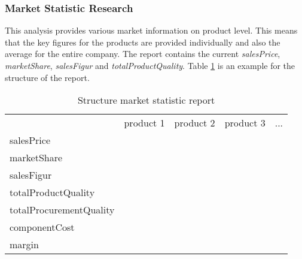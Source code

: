 \subsubsection{Market Statistic Research}
This analysis provides various market information on product level. This means that the key figures for the products are provided individually and also the average for the entire company. The report contains the current \textit{salesPrice}, \textit{marketShare}, \textit{salesFigur} and \textit{totalProductQuality}. Table \ref{MR_market_statistic} is an example for the structure of the report. \\

\begin{table}[ht]
\centering
\begin{tabular}{|l|r|r|r|r|}
\hline
                    & product 1   & product 2  & product 3 & ...       \\
salesPrice          &             &            &           &           \\
marketShare         &             &            &           &           \\
salesFigur          &             &            &           &           \\
totalProductQuality &             &            &           &           \\
totalProcurementQuality  &             &            &           &           \\
componentCost       &             &            &           &           \\
margin              &             &            &           &           \\
\hline
\end{tabular}
\caption{Structure market statistic report}
\label{MR_market_statistic}
\end{table}